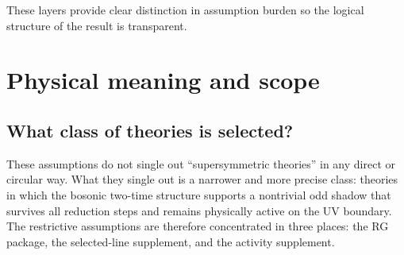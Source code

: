 \documentclass[
  aps,
  prd,
  onecolumn,
  notitlepage,
  nofootinbib,
  superscriptaddress,
  10pt
]{revtex4-2}
\theoremstyle{definition}
\theoremstyle{plain}
\begin{document}
These layers provide clear distinction in assumption burden so the logical structure of the result is transparent.

\section{Physical meaning and scope}
\label{sec:rg-monotone-good}

\subsection{What class of theories is selected?}

These assumptions do not single out
``supersymmetric theories'' in any direct or circular way.  What they single
out is a narrower and more precise class: theories in which the bosonic
two-time structure supports a nontrivial odd shadow that survives all
reduction steps and remains physically active on the UV boundary.  The
restrictive assumptions are therefore concentrated in three places: the RG
package, the selected-line supplement, and the activity supplement.
\end{document}
